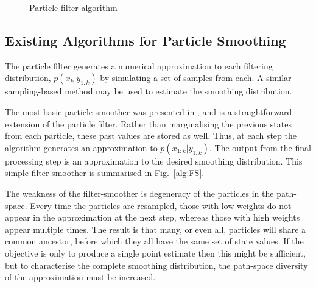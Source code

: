 \documentclass[peerreview,11pt,draftcls,onecolumn]{IEEEtran}
\begin{document}
\begin{figure}
\caption{Particle filter algorithm}
\label{alg:PF}
\end{figure}

\subsection{Existing Algorithms for Particle Smoothing } \label{sec:existing_smoothers}

The particle filter generates a numerical approximation to each filtering distribution, $p(x_k|y_{1:k})$ by simulating a set of samples from each. A similar sampling-based method may be used to estimate the smoothing distribution.

The most basic particle smoother was presented in \cite{Kitagawa1996}, and is a straightforward extension of the particle filter. Rather than marginalising the previous states from each particle, these past values are stored as well. Thus, at each step the algorithm generates an approximation to $p(x_{1:k}|y_{1:k})$. The output from the final processing step is an approximation to the desired smoothing distribution. This simple filter-smoother is summarised in Fig.~\ref{alg:FS}.

The weakness of the filter-smoother is degeneracy of the particles in the path-space. Every time the particles are resampled, those with low weights do not appear in the approximation at the next step, whereas those with high weights appear multiple times. The result is that many, or even all, particles will share a common ancestor, before which they all have the same set of state values. If the objective is only to produce a single point estimate then this might be sufficient, but to characterise the complete smoothing distribution, the path-space diversity of the approximation must be increased.
\end{document}
